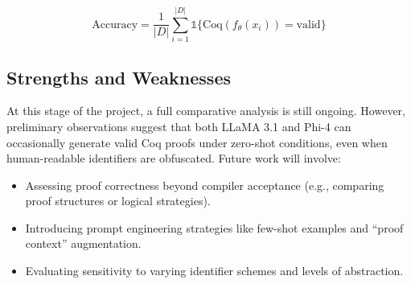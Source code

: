 \[
\text{Accuracy} = \frac{1}{|D|} \sum_{i=1}^{|D|} \mathbb{1}\{ \text{Coq}(f_\theta(x_i)) = \text{valid} \}
\]

\subsection{Strengths and Weaknesses}
At this stage of the project, a full comparative analysis is still ongoing. However, preliminary observations suggest that both LLaMA 3.1 and Phi-4 can occasionally generate valid Coq proofs under zero-shot conditions, even when human-readable identifiers are obfuscated. Future work will involve:

\begin{itemize}
  \item Assessing proof correctness beyond compiler acceptance (e.g., comparing proof structures or logical strategies).
  \item Introducing prompt engineering strategies like few-shot examples and ``proof context'' augmentation.
  \item Evaluating sensitivity to varying identifier schemes and levels of abstraction.
\end{itemize}
